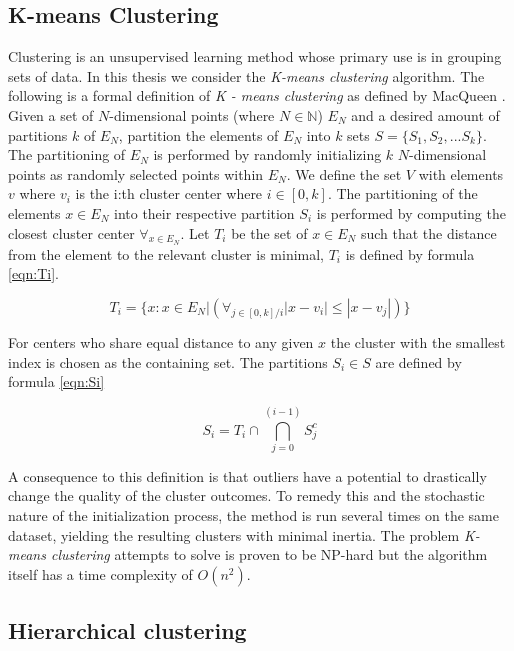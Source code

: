 \subsection{K-means Clustering}

Clustering is an unsupervised learning method whose primary use is in grouping sets of data. In this thesis we consider the \textit{K-means clustering} algorithm. The following is a formal definition of \textit{K - means clustering} as defined by MacQueen \cite{macqueen}. Given a set of $N$-dimensional points (where $N \in \mathbb{N}$) $E_N$ and a desired amount of partitions $k$ of $E_N$, partition the elements of $E_N$ into $k$ sets $S = \{S_1, S_2, ... S_k\}$. The partitioning of $E_N$ is performed by randomly initializing $k$  $N$-dimensional points as randomly selected points within $E_N$. We define the set $V$ with elements $v$ where $v_i$ is the i:th cluster center where $i \in [0, k]$. The partitioning of the elements $x \in E_N$ into their respective partition $S_i$ is performed by computing the closest cluster center $\forall_{x \in E_N}$. Let $T_i$ be the set of $x \in E_N$ such that the distance from the element to the relevant cluster is minimal, $T_i$ is defined by formula \ref{eqn:Ti}.

\begin{equation}
\label{eqn:Ti}
T_i = \{x : x \in E_N | (\forall_{j \in [0, k]/i } |x - v_i| \leq |x - v_j|)\} 
\end{equation}

For centers who share equal distance to any given $x$ the cluster with the smallest index is chosen as the containing set. The partitions $S_i \in S$ are defined by formula \ref{eqn:Si}

\begin{equation}
\label{eqn:Si}
S_i = T_i \cap \bigcap_{j=0}^{(i-1)} S_j^c
\end{equation}

A consequence to this definition is that outliers have a potential to drastically change the quality of the cluster outcomes\cite{chawla2013k}. To remedy this and the stochastic nature of the initialization process, the method is run several times on the same dataset, yielding the resulting clusters with minimal inertia. The problem \textit{K-means clustering} attempts to solve is proven to be NP-hard\cite{chawla2013k}\cite{mahajan2009planar} but the algorithm itself has a time complexity of $O(n^2)$\cite{pakhira2014linear}.


\subsection{Hierarchical clustering}

